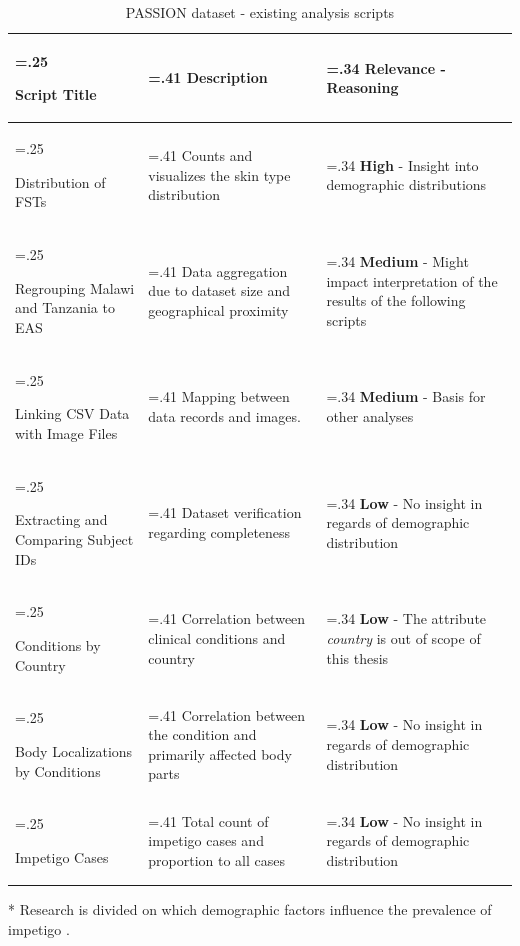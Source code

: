 \documentclass[12pt, a4paper, oneside]{book}   	%
\begin{document}
\begin{appendices}
			\begin{table}[H]
				\centering
				\begin{threeparttable}
					\begin{tabularx}{\textwidth}{>{\hsize=.25\hsize\raggedright}X>{\hsize=.41\hsize}X>{\hsize=.34\hsize}X}
						\toprule
						\textbf{Script Title}       & \textbf{Description} & \textbf{Relevance - Reasoning}       \\ \midrule
						Distribution of \glspl{FST} &
						Counts and visualizes the skin type distribution  &
						\textbf{High} - Insight into demographic distributions \\
						\hline
						Regrouping Malawi and Tanzania to EAS &
						Data aggregation due to dataset size and geographical proximity &
						\textbf{Medium} - Might impact interpretation of the results of the following scripts \\
						\hline
						Linking CSV Data with Image Files & 
						Mapping between data records and images. &
						\textbf{Medium} - Basis for other analyses \\
						\hline
						Extracting and Comparing Subject IDs &
						Dataset verification regarding completeness &
						\textbf{Low} - No insight in regards of demographic distribution \\
						\hline
						Conditions by Country &
						Correlation between clinical conditions and country &
						\textbf{Low} - The attribute \textit{country} is out of scope of this thesis \\
						\hline
						Body Localizations by Conditions &
						Correlation between the condition and primarily affected body parts &
						\textbf{Low} - No insight in regards of demographic distribution \\
						\hline
						Impetigo Cases &
						Total count of impetigo cases and proportion to all cases &
						\textbf{Low} - No insight in regards of demographic distribution\tnote{*} \\
						\bottomrule
					\end{tabularx}
					\begin{tablenotes}
						\footnotesize
						\item[*] Research is divided on which demographic factors influence the prevalence of impetigo \autocites{Romani_2017}{Aleid_2024}.
					\end{tablenotes}
				\end{threeparttable}
				
				\caption{PASSION dataset - existing analysis scripts \autocite{Gottfrois2024}}
				\label{tab:PASSION_scripts}
			\end{table}
			

\end{appendices}
\end{document}
